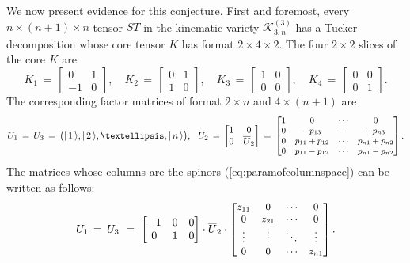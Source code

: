 \documentclass[english]{ourlematema}
\numberwithin{theorem}{section}
\theoremstyle{definition}
\begin{document}
We now present evidence for this conjecture. First and foremost,
every $n \times (n+1) \times n$ tensor $ST$ in the kinematic variety $ \mathcal{K}^{(3)}_{3,n}$
 has a Tucker decomposition whose core tensor $K$
has format  $2 \times 4 \times 2$. The four $2 \times 2$ slices of the core $K$ are
    $$
    K_1 \,=\, \begin{bmatrix}
        0 & 1\\
        -1 & 0 
    \end{bmatrix}, \quad K_2 \,=\, \begin{bmatrix}
        0 & 1\\
        1 & 0 
    \end{bmatrix}, \quad K_3 \,=\, \begin{bmatrix}
        1 & 0\\
        0 & 0 
    \end{bmatrix},\quad K_4 \,=\, \begin{bmatrix}
        0 & 0\\
        0 & 1
    \end{bmatrix}.
    $$
    The corresponding factor matrices of format $2 \times n$ and $4 \times (n+1)$ are
    $$
    U_1 \,=\, U_3 \,= \,\bigl(
      | \, 1 \, \rangle , | \, 2 \, \rangle ,   \ldots,       | \, n \,  \rangle \bigr), \,\,\,\, 
      U_2 \,=\, \begin{bmatrix}
      1 & 0 \\ 0 & \overline{U}_2 
      \end{bmatrix} \,=\,
      \begin{small}
      \begin{bmatrix}
          1 & 0 & \cdots & 0\\
          0 & -p_{13} &  \cdots &  -p_{n3}\\
          0 & p_{11} + p_{12} &  \cdots &  p_{n1} + p_{n2}\\
          0 & p_{11} - p_{12} &  \cdots &  p_{n1} - p_{n2}\\
      \end{bmatrix}. \end{small}
    $$
    The matrices whose columns are the spinors (\ref{eq:paramofcolumnspace}) can be written as follows:
$$            U_1 \,=\, U_3 \,   \,=\,\, \begin{bmatrix}
        -1 & 0 & 0\\
        0 & 1 & 0
    \end{bmatrix} \cdot \overline{U}_2 \cdot 
    \begin{small} \begin{bmatrix}
        z_{11} & 0 & \cdots & 0\\
        0 & z_{21} & \cdots & 0\\
        \vdots & \vdots & \ddots & \vdots\\
        0 & 0 & \cdots & z_{n1}\\
    \end{bmatrix}. \end{small}
    $$
    
\end{document}
